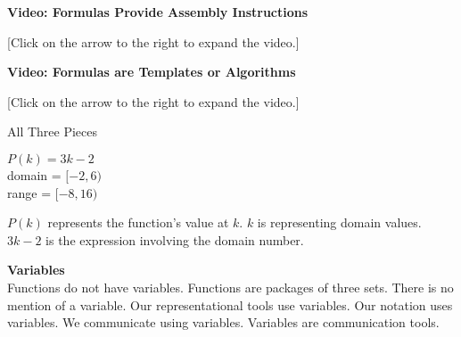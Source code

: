 \documentclass{ximera}
\begin{document}
\begin{explanation} \textbf{Video: Formulas Provide Assembly Instructions}

[Click on the arrow to the right to expand the video.]
\begin{expandable} 

\begin{center}
\end{center}

\end{expandable}
\end{explanation}




\begin{explanation} \textbf{Video: Formulas are Templates or Algorithms}

[Click on the arrow to the right to expand the video.]
\begin{expandable} 

\begin{center}
\end{center}

\end{expandable}
\end{explanation}








\begin{example}   All Three Pieces 

$P(k) = 3k - 2$ \\
domain = $[-2, 6)$ \\
range = $[-8, 16)$


$P(k)$ represents the function's value at $k$.  $k$ is representing domain values. $3k - 2$ is the expression involving the domain number.

\end{example}




\begin{warning} \textbf{\textcolor{red!90!darkgray}{Variables}}    \\

Functions do not have variables.  Functions are packages of three sets.  There is no mention of a variable. Our representational tools use variables. Our notation uses variables. We communicate using variables.  Variables are communication tools. 

\end{warning}
\end{document}
